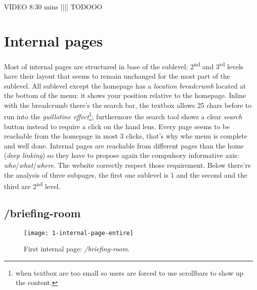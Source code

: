 \documentclass[
12pt, %
a4paper, %
oneside, %
headinclude,footinclude, %
BCOR5mm, %
]{scrartcl}
\begin{document}
VIDEO 8:30 mins
 |||| TODOOO



\section{Internal pages}
Most of internal pages are structured in base of the sublevel: 2\textsuperscript{nd} and 3\textsuperscript{rd} levels have their layout that seems to remain unchanged for the most part of the sublevel.
All sublevel except the homepage has a \emph{location breadcrumb} located at the bottom of the menu: it shows your position relative to the homepage. Inline with the breadcrumb there's the search bar, the textbox allows 25 chars before to run into the \emph{guillotine effect}\footnote{when textbox are too small so users are forced to use scrollbars to show up the content.}; furthermore the search tool shows a clear \emph{search} button instead to require a click on the hand lens. 
Every page seems to be reachable from the homepage in most 3 clicks, that's why whe menu is complete and well done. 
Internal pages are reachable from different pages than the home (\emph{deep linking}) so they have to propose again the compulsory informative axis: \emph{who}/\emph{what}/\emph{where}. The website correctly respect those requirement.
Below there're the analysis of three subpages, the first one sublevel is 1 and the second and the third are 2\textsuperscript{nd} level.

	\subsection{/briefing-room}
	

	\begin{figure}[h!]
	\centering 
	\centerline{\texttt{[image: 1-internal-page-entire]}}
	\caption[First internal page: /briefing-room]{First internal page: \emph{/briefing-room}.}
	\label{fig:primapaginainterna} 
	\end{figure}
\end{document}
